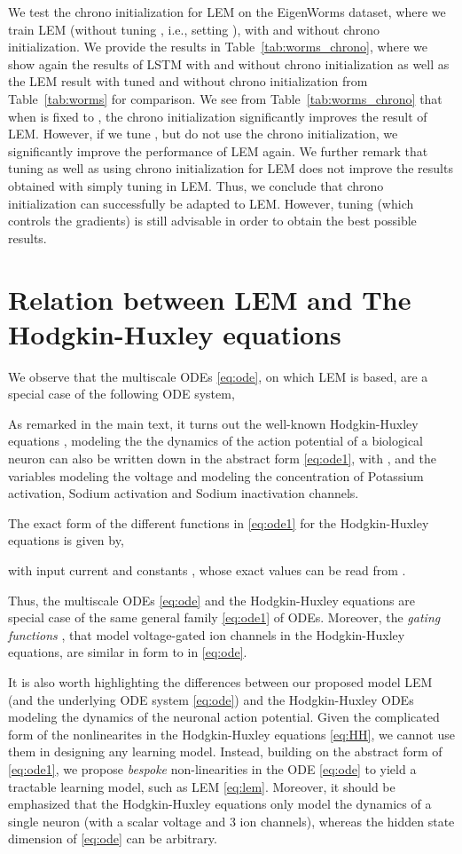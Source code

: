 \documentclass{article} \usepackage{iclr2022_conference,times}
\newcommand{\Tref}[1]{Table~\ref{#1}}
\begin{document}
We test the chrono initialization for LEM on the EigenWorms dataset, where we train LEM (without tuning , i.e., setting ), with and without chrono initialization. We provide the results in \Tref{tab:worms_chrono}, where we show again the results of LSTM with and without chrono initialization as well as the LEM result with tuned  and without chrono initialization from \Tref{tab:worms} for comparison. 
We see from \Tref{tab:worms_chrono} that when  is fixed to , the chrono initialization significantly improves the result of LEM. However, if we tune , but do not use the chrono initialization, we significantly improve the performance of LEM again. We further remark that tuning  as well as using chrono initialization for LEM does not improve the results obtained with simply tuning  in LEM. Thus, we conclude that chrono initialization can successfully be adapted to LEM. However, tuning  (which controls the gradients) is still advisable in order to obtain the best possible results.






\section{Relation between LEM and The Hodgkin-Huxley equations}
\label{app:HH}
We observe that the multiscale ODEs \eqref{eq:ode}, on which LEM is based, are a special case of the following ODE system,

As remarked in the main text, it turns out the well-known Hodgkin-Huxley equations \citet{HH}, modeling the the dynamics of the action potential of a biological neuron can also be written down in the abstract form \eqref{eq:ode1}, with ,  and the variables  modeling the voltage and  modeling the concentration of Potassium activation, Sodium activation and Sodium inactivation channels. 

The exact form of the different functions in \eqref{eq:ode1} for the Hodgkin-Huxley equations is given by,

with input current  and constants , whose exact values can be read from \citep{HH}. 

Thus, the multiscale ODEs \eqref{eq:ode} and the Hodgkin-Huxley equations are special case of the same general family \eqref{eq:ode1} of ODEs. Moreover, the \emph{gating functions} , that model voltage-gated ion channels in the Hodgkin-Huxley equations, are similar in form to  in \eqref{eq:ode}.  

It is also worth highlighting the differences between our proposed model LEM (and the underlying ODE system \eqref{eq:ode}) and the Hodgkin-Huxley ODEs modeling the dynamics of the neuronal action potential. Given the complicated form of the nonlinearites  in the Hodgkin-Huxley equations \eqref{eq:HH}, we cannot use them in designing any learning model. Instead, building on the abstract form of \eqref{eq:ode1}, we propose \emph{bespoke} non-linearities in the ODE \eqref{eq:ode} to yield a tractable learning model, such as LEM \eqref{eq:lem}. Moreover, it should be emphasized that the Hodgkin-Huxley equations only model the dynamics of a single neuron (with a scalar voltage and 3 ion channels), whereas the hidden state dimension  of \eqref{eq:ode} can be arbitrary. 
\end{document}
